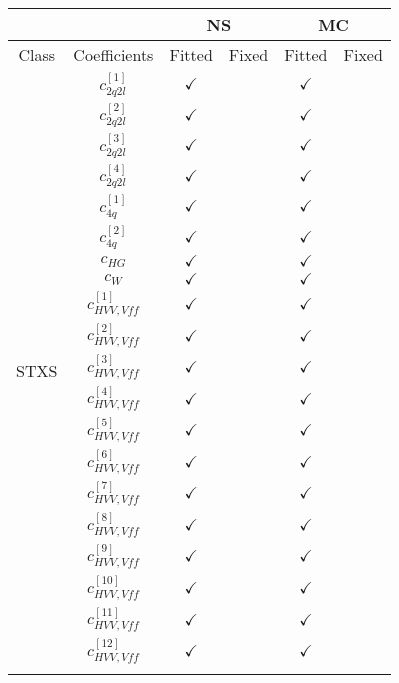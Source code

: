 \documentclass{article}
\begin{document}
\begin{table}[H]
\centering
\begin{tabular}{|c|c|c|c|c|c|}
\hline
 &  & \multicolumn{2}{c|}{NS}  & \multicolumn{2}{c|}{MC}  \\ \hline
Class & Coefficients & Fitted & Fixed  & Fitted & Fixed  \\ \hline
\multirow{28}{*}{STXS}
 & $c_{2q2l}^{[1]}$ & $\checkmark$ &  & $\checkmark$ & \\ \cline{2-6}
 & $c_{2q2l}^{[2]}$ & $\checkmark$ &  & $\checkmark$ & \\ \cline{2-6}
 & $c_{2q2l}^{[3]}$ & $\checkmark$ &  & $\checkmark$ & \\ \cline{2-6}
 & $c_{2q2l}^{[4]}$ & $\checkmark$ &  & $\checkmark$ & \\ \cline{2-6}
 & $c_{4q}^{[1]}$ & $\checkmark$ &  & $\checkmark$ & \\ \cline{2-6}
 & $c_{4q}^{[2]}$ & $\checkmark$ &  & $\checkmark$ & \\ \cline{2-6}
 & $c_{HG}$ & $\checkmark$ &  & $\checkmark$ & \\ \cline{2-6}
 & $c_{W}$ & $\checkmark$ &  & $\checkmark$ & \\ \cline{2-6}
 & $c_{HVV,Vff}^{[1]}$ & $\checkmark$ &  & $\checkmark$ & \\ \cline{2-6}
 & $c_{HVV,Vff}^{[2]}$ & $\checkmark$ &  & $\checkmark$ & \\ \cline{2-6}
 & $c_{HVV,Vff}^{[3]}$ & $\checkmark$ &  & $\checkmark$ & \\ \cline{2-6}
 & $c_{HVV,Vff}^{[4]}$ & $\checkmark$ &  & $\checkmark$ & \\ \cline{2-6}
 & $c_{HVV,Vff}^{[5]}$ & $\checkmark$ &  & $\checkmark$ & \\ \cline{2-6}
 & $c_{HVV,Vff}^{[6]}$ & $\checkmark$ &  & $\checkmark$ & \\ \cline{2-6}
 & $c_{HVV,Vff}^{[7]}$ & $\checkmark$ &  & $\checkmark$ & \\ \cline{2-6}
 & $c_{HVV,Vff}^{[8]}$ & $\checkmark$ &  & $\checkmark$ & \\ \cline{2-6}
 & $c_{HVV,Vff}^{[9]}$ & $\checkmark$ &  & $\checkmark$ & \\ \cline{2-6}
 & $c_{HVV,Vff}^{[10]}$ & $\checkmark$ &  & $\checkmark$ & \\ \cline{2-6}
 & $c_{HVV,Vff}^{[11]}$ & $\checkmark$ &  & $\checkmark$ & \\ \cline{2-6}
 & $c_{HVV,Vff}^{[12]}$ & $\checkmark$ &  & $\checkmark$ & \\ \cline{2-6}

\end{tabular}
\end{table}
\end{document}
